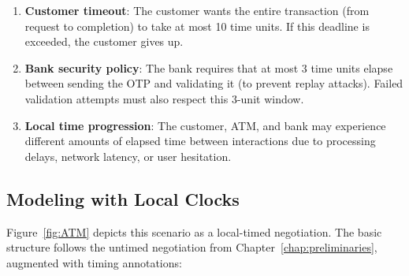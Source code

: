 \begin{enumerate}
\item \textbf{Customer timeout}: The customer wants the entire transaction (from request to completion) to take at most 10 time units. If this deadline is exceeded, the customer gives up.

\item \textbf{Bank security policy}: The bank requires that at most 3 time units elapse between sending the OTP and validating it (to prevent replay attacks). Failed validation attempts must also respect this 3-unit window.

\item \textbf{Local time progression}: The customer, ATM, and bank may experience different amounts of elapsed time between interactions due to processing delays, network latency, or user hesitation.
\end{enumerate}

\subsection{Modeling with Local Clocks}

Figure~\ref{fig:ATM} depicts this scenario as a local-timed negotiation. The basic structure follows the untimed negotiation from Chapter~\ref{chap:preliminaries}, augmented with timing annotations:

